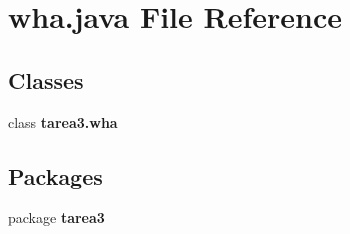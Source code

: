 \section{wha.\+java File Reference}
\label{wha_8java}
\subsection*{Classes}
\begin{DoxyCompactItemize}
\item 
class {\bf tarea3.\+wha}
\end{DoxyCompactItemize}
\subsection*{Packages}
\begin{DoxyCompactItemize}
\item 
package {\bf tarea3}
\end{DoxyCompactItemize}
